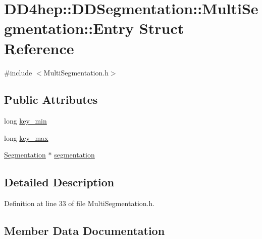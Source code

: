 \hypertarget{struct_d_d4hep_1_1_d_d_segmentation_1_1_multi_segmentation_1_1_entry}{}\section{D\+D4hep\+:\+:D\+D\+Segmentation\+:\+:Multi\+Segmentation\+:\+:Entry Struct Reference}
\label{struct_d_d4hep_1_1_d_d_segmentation_1_1_multi_segmentation_1_1_entry}


{\ttfamily \#include $<$Multi\+Segmentation.\+h$>$}

\subsection*{Public Attributes}
\begin{DoxyCompactItemize}
\item 
long \hyperlink{struct_d_d4hep_1_1_d_d_segmentation_1_1_multi_segmentation_1_1_entry_a45ab402e1cc51a736d358270935ce0b1}{key\+\_\+min}
\item 
long \hyperlink{struct_d_d4hep_1_1_d_d_segmentation_1_1_multi_segmentation_1_1_entry_af019d706caaf4aa334dd6c264bfe36cc}{key\+\_\+max}
\item 
\hyperlink{class_d_d4hep_1_1_d_d_segmentation_1_1_segmentation}{Segmentation} $\ast$ \hyperlink{struct_d_d4hep_1_1_d_d_segmentation_1_1_multi_segmentation_1_1_entry_a1850766ca41dccd7dfdc11806d4eef34}{segmentation}
\end{DoxyCompactItemize}


\subsection{Detailed Description}


Definition at line 33 of file Multi\+Segmentation.\+h.



\subsection{Member Data Documentation}
\hypertarget{struct_d_d4hep_1_1_d_d_segmentation_1_1_multi_segmentation_1_1_entry_af019d706caaf4aa334dd6c264bfe36cc}{}\label{struct_d_d4hep_1_1_d_d_segmentation_1_1_multi_segmentation_1_1_entry_af019d706caaf4aa334dd6c264bfe36cc} 
